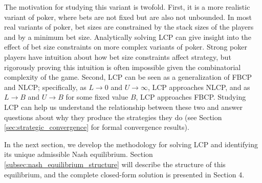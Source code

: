 \documentclass[../../main/main.tex]{subfiles}
\begin{document}
The motivation for studying this variant is twofold. First, it is a more realistic variant of poker, where bets are not fixed but are also not unbounded. In most real variants of poker, bet sizes are constrained by the stack sizes of the players and by a minimum bet size. Analytically solving LCP can give insight into the effect of bet size constraints on more complex variants of poker. Strong poker players have intuition about how bet size constraints affect strategy, but rigorously proving this intuition is often impossible given the combinatorial complexity of the game. Second, LCP can be seen as a generalization of FBCP and NLCP; specifically, as $L \to 0$ and $U \to \infty$, LCP approaches NLCP, and as $L \to B$ and $U \to B$ for some fixed value $B$, LCP approaches FBCP. Studying LCP can help us understand the relationship between these two and answer questions about why they produce the strategies they do (see Section \ref{sec:strategic_convergence} for formal convergence results).

In the next section, we develop the methodology for solving LCP and identifying its unique admissible Nash equilibrium. Section \ref{subsec:nash_equilibrium_structure} will describe the structure of this equilibrium, and the complete closed-form solution is presented in Section 4.
\end{document}
